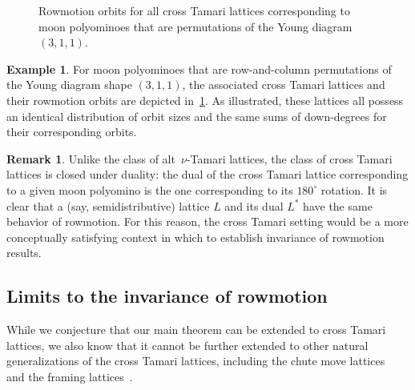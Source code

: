 \documentclass[11pt]{amsart}
\newcounter{width}
\theoremstyle{definition}
\newtheorem{remark}[theorem]{Remark}
\newtheorem{example}[theorem]{Example}
\begin{document}
\begin{figure}[ht]
\begin{center}
\end{center}
\caption{Rowmotion orbits for all cross Tamari lattices corresponding to moon polyominoes that are permutations of the Young diagram $(3,1,1)$.}
\label{fig:example_cross}
\end{figure}

\begin{example}
For moon polyominoes that are row-and-column permutations of the Young diagram shape $(3,1,1)$, the associated cross Tamari lattices and their rowmotion orbits are depicted in~\cref{fig:example_cross}. As illustrated, these lattices all possess an identical distribution of orbit sizes and the same sums of down-degrees for their corresponding orbits.
\end{example}

\begin{remark}
Unlike the class of alt~$\nu$-Tamari lattices, the class of cross Tamari lattices is closed under duality: the dual of the cross Tamari lattice corresponding to a given moon polyomino is the one corresponding to its $180^\circ$ rotation. It is clear that a (say, semidistributive) lattice $L$ and its dual $L^*$ have the same behavior of rowmotion. For this reason, the cross Tamari setting would be a more conceptually satisfying context in which to establish invariance of rowmotion results.
\end{remark}

\subsection{Limits to the invariance of rowmotion}

While we conjecture that our main theorem can be extended to cross Tamari lattices, we also know that it cannot be further extended to other natural generalizations of the cross Tamari lattices, including the chute move lattices~\cite{rubey2012maximal,axelrodfreed2025chute,billey2025lattice} and the framing lattices~\cite{vonbell2025framing}.
\end{document}
